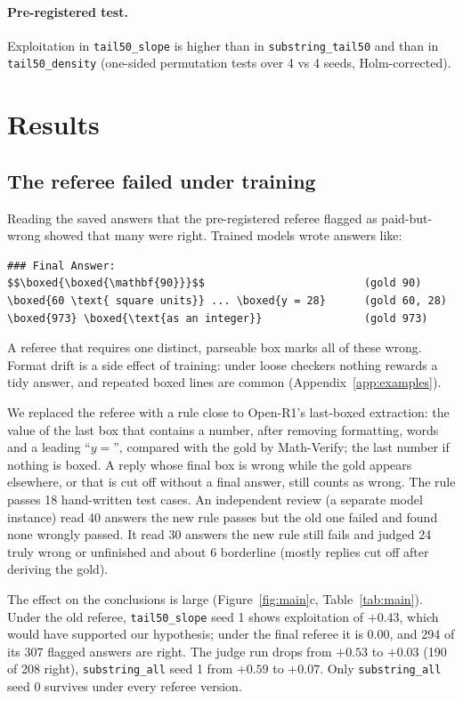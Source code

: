 \documentclass[11pt]{article}
\begin{document}
\paragraph{Pre-registered test.} Exploitation in \texttt{tail50\_slope} is higher than in \texttt{substring\_tail50} and than in \texttt{tail50\_density} (one-sided permutation tests over 4 vs 4 seeds, Holm-corrected).

\section{Results}
\subsection{The referee failed under training}
\label{sec:artefact}
Reading the saved answers that the pre-registered referee flagged as paid-but-wrong showed that many were right. Trained models wrote answers like:
\begin{Verbatim}
### Final Answer:
$$\boxed{\boxed{\mathbf{90}}}$$                         (gold 90)
\boxed{60 \text{ square units}} ... \boxed{y = 28}      (gold 60, 28)
\boxed{973} \boxed{\text{as an integer}}                (gold 973)
\end{Verbatim}
A referee that requires one distinct, parseable box marks all of these wrong. Format drift is a side effect of training: under loose checkers nothing rewards a tidy answer, and repeated boxed lines are common (Appendix~\ref{app:examples}).

We replaced the referee with a rule close to Open-R1's last-boxed extraction: the value of the last box that contains a number, after removing formatting, words and a leading ``$y=$'', compared with the gold by Math-Verify; the last number if nothing is boxed. A reply whose final box is wrong while the gold appears elsewhere, or that is cut off without a final answer, still counts as wrong. The rule passes 18 hand-written test cases. An independent review (a separate model instance) read 40 answers the new rule passes but the old one failed and found none wrongly passed. It read 30 answers the new rule still fails and judged 24 truly wrong or unfinished and about 6 borderline (mostly replies cut off after deriving the gold).


The effect on the conclusions is large (Figure~\ref{fig:main}c, Table~\ref{tab:main}). Under the old referee, \texttt{tail50\_slope} seed 1 shows exploitation of $+0.43$, which would have supported our hypothesis; under the final referee it is $0.00$, and 294 of its 307 flagged answers are right. The judge run drops from $+0.53$ to $+0.03$ (190 of 208 right), \texttt{substring\_all} seed 1 from $+0.59$ to $+0.07$. Only \texttt{substring\_all} seed 0 survives under every referee version.
\end{document}
